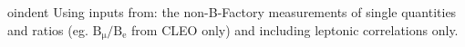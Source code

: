 
oindent Using inputs from: the non-B-Factory measurements of single quantities and ratios (eg. $\mathrm{B_\mu/B_e}$ from CLEO only) and including leptonic correlations only.
